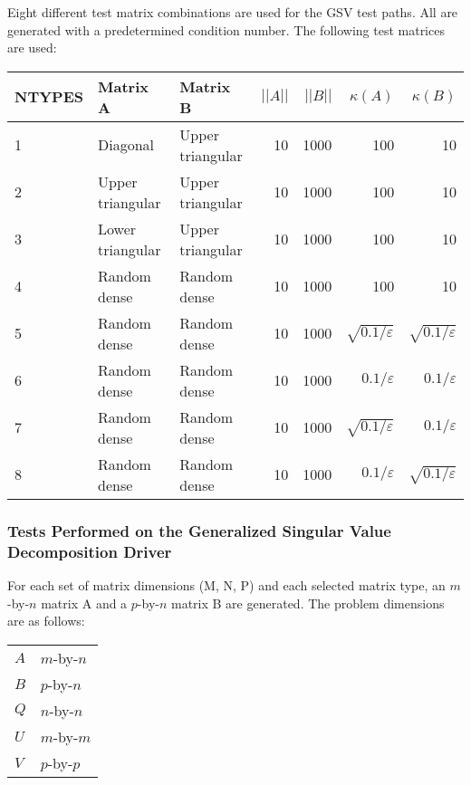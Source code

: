 \dent
Eight different test matrix combinations are used for the GSV
test
paths.  All are
generated with a predetermined condition number.  The following test
matrices are used:
\TS
\begin{tabular}{|l|l|l|r|r|r|r|} \hline
NTYPES & Matrix A & Matrix B & $||A||$ & $||B||$ & $\kappa(A)$ &
$\kappa(B)$ \\
\hline
1      & Diagonal & Upper triangular & 10 & 1000 & 100 & 10 \\
2      & Upper triangular & Upper triangular & 10 & 1000 & 100 & 10 \\
3      & Lower triangular & Upper triangular & 10 & 1000 & 100 & 10 \\
4      & Random dense & Random dense & 10 & 1000 & 100 & 10 \\
5      & Random dense & Random dense & 10 & 1000 & $\sqrt{0.1/\varepsilon}$ & $\sqrt{0.1/\varepsilon}$ \\
6      & Random dense & Random dense & 10 & 1000 & $0.1/\varepsilon$ & $0.1/\varepsilon$ \\
7      & Random dense & Random dense & 10 & 1000 & $\sqrt{0.1/\varepsilon}$ & $0.1/\varepsilon$ \\
8      & Random dense & Random dense & 10 & 1000 & $0.1/\varepsilon$ & $\sqrt{0.1/\varepsilon}$ \\ \hline
\end{tabular}
\TE

\subsubsection{Tests Performed on the Generalized Singular Value Decomposition Driver}

\dent
For each set of matrix dimensions (M, N, P) and each selected matrix
type, an $m$-by-$n$ matrix A and a $p$-by-$n$ matrix B are generated.
The problem dimensions are as follows:
\begin{center}
  \begin{tabular}{ll}
   $A$      &    $m$-by-$n$ \\
   $B$      &    $p$-by-$n$ \\
   $Q$      &    $n$-by-$n$ \\
   $U$      &    $m$-by-$m$ \\
   $V$      &    $p$-by-$p$
  \end{tabular}
\end{center}

